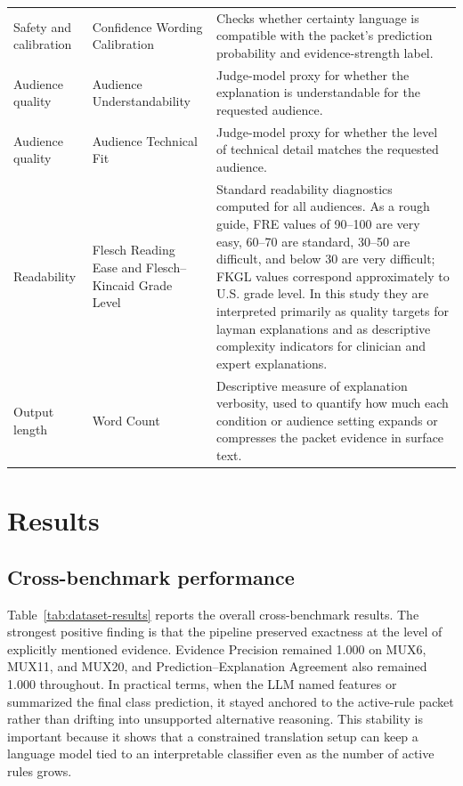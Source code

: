 \documentclass[sigconf,nonacm]{acmart}
\begin{document}
\begin{table}[t]
\begin{tabular}{p{2.8cm}p{2.7cm}p{10.1cm}}
Safety and calibration & Confidence Wording Calibration & Checks whether certainty language is compatible with the packet's prediction probability and evidence-strength label. \\
Audience quality & Audience Understandability & Judge-model proxy for whether the explanation is understandable for the requested audience. \\
Audience quality & Audience Technical Fit & Judge-model proxy for whether the level of technical detail matches the requested audience. \\
Readability & Flesch Reading Ease and Flesch--Kincaid Grade Level & Standard readability diagnostics computed for all audiences. As a rough guide, FRE values of 90--100 are very easy, 60--70 are standard, 30--50 are difficult, and below 30 are very difficult; FKGL values correspond approximately to U.S. grade level. In this study they are interpreted primarily as quality targets for layman explanations and as descriptive complexity indicators for clinician and expert explanations. \\
Output length & Word Count & Descriptive measure of explanation verbosity, used to quantify how much each condition or audience setting expands or compresses the packet evidence in surface text. \\
\bottomrule
\end{tabular}
\end{table}

\section{Results}
\subsection{Cross-benchmark performance}
Table~\ref{tab:dataset-results} reports the overall cross-benchmark results. The strongest positive finding is that the pipeline preserved exactness at the level of explicitly mentioned evidence. Evidence Precision remained 1.000 on MUX6, MUX11, and MUX20, and Prediction--Explanation Agreement also remained 1.000 throughout. In practical terms, when the LLM named features or summarized the final class prediction, it stayed anchored to the active-rule packet rather than drifting into unsupported alternative reasoning. This stability is important because it shows that a constrained translation setup can keep a language model tied to an interpretable classifier even as the number of active rules grows.
\end{document}
